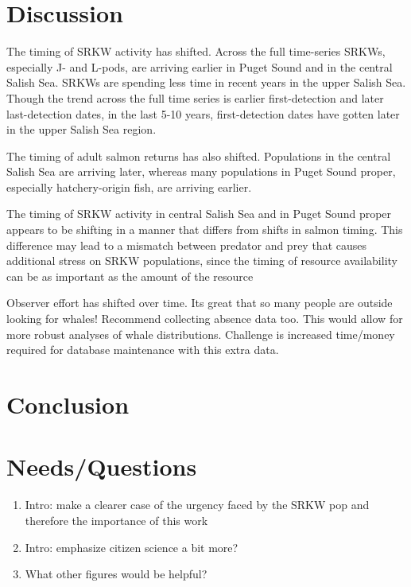 \documentclass{article}
\begin{document}
\section*{Discussion}
\par The timing of SRKW activity has shifted. Across the full time-series SRKWs, especially J- and L-pods, are arriving earlier in Puget Sound and in the central Salish Sea. SRKWs are spending less time in recent years in the upper Salish Sea. Though the trend across the full time series is earlier first-detection and later last-detection dates, in the last 5-10 years, first-detection dates have gotten later in the upper Salish Sea region.
\par The timing of adult salmon returns has also shifted. Populations in the central Salish Sea are arriving later, whereas many populations in Puget Sound proper, especially hatchery-origin fish, are arriving earlier. 
\par The timing of SRKW activity in central Salish Sea and in Puget Sound proper appears to be shifting in a manner that differs from shifts in salmon timing. This difference may lead to a mismatch between predator and prey that causes additional stress on SRKW populations, since the timing of resource availability can be as important as the amount of the resource \citep[Brianna's work,][]{hipfner2008}
\par Observer effort has shifted over time. Its great that so many people are outside looking for whales! Recommend collecting absence data too. This would allow for more robust analyses of whale distributions. Challenge is increased time/money required for database maintenance with this extra data.

\section*{Conclusion}

\section*{Needs/Questions}

\begin{enumerate}
\item Intro: make a clearer case of the urgency faced by the SRKW pop and therefore the importance of this work
\item Intro: emphasize citizen science a bit more?
\item What other figures would be helpful?
\end{enumerate}
\end{document}
